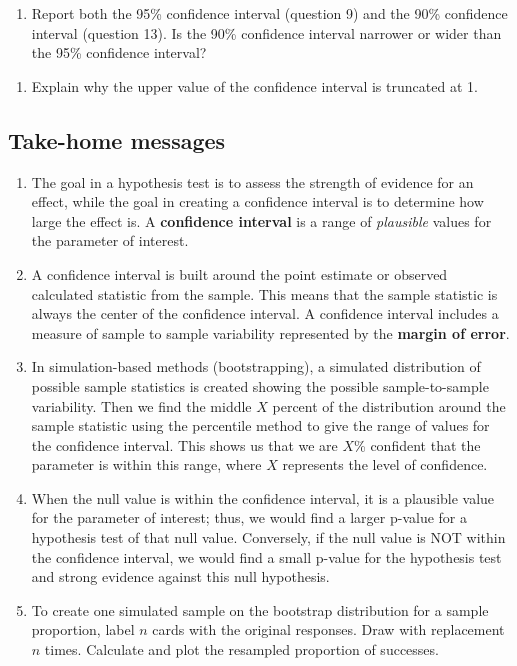 \documentclass[
]{report}
\providecommand{\tightlist}{%
  \setlength{\itemsep}{0pt}\setlength{\parskip}{0pt}}
\begin{document}
\begin{enumerate}
\def\labelenumi{\arabic{enumi}.}
\setcounter{enumi}{13}
\tightlist
\item
  Report both the 95\% confidence interval (question 9) and the 90\% confidence interval (question 13). Is the 90\% confidence interval narrower or wider than the 95\% confidence interval?
\end{enumerate}

\vspace{0.5in}

\begin{enumerate}
\def\labelenumi{\arabic{enumi}.}
\setcounter{enumi}{14}
\tightlist
\item
  Explain why the upper value of the confidence interval is truncated at 1.
\end{enumerate}

\vspace{0.5in}
\newpage

\hypertarget{take-home-messages-9}{%
\subsection{Take-home messages}\label{take-home-messages-9}}

\begin{enumerate}
\def\labelenumi{\arabic{enumi}.}
\item
  The goal in a hypothesis test is to assess the strength of evidence for an effect, while the goal in creating a confidence interval is to determine how large the effect is. A \textbf{confidence interval} is a range of \emph{plausible} values for the parameter of interest.
\item
  A confidence interval is built around the point estimate or observed calculated statistic from the sample. This means that the sample statistic is always the center of the confidence interval. A confidence interval includes a measure of sample to sample variability represented by the \textbf{margin of error}.
\item
  In simulation-based methods (bootstrapping), a simulated distribution of possible sample statistics is created showing the possible sample-to-sample variability. Then we find the middle \(X\) percent of the distribution around the sample statistic using the percentile method to give the range of values for the confidence interval. This shows us that we are \(X\)\% confident that the parameter is within this range, where \(X\) represents the level of confidence.
\item
  When the null value is within the confidence interval, it is a plausible value for the parameter of interest; thus, we would find a larger p-value for a hypothesis test of that null value. Conversely, if the null value is NOT within the confidence interval, we would find a small p-value for the hypothesis test and strong evidence against this null hypothesis.
\item
  To create one simulated sample on the bootstrap distribution for a sample proportion, label \(n\) cards with the original responses. Draw with replacement \(n\) times. Calculate and plot the resampled proportion of successes.
\end{enumerate}
\end{document}

